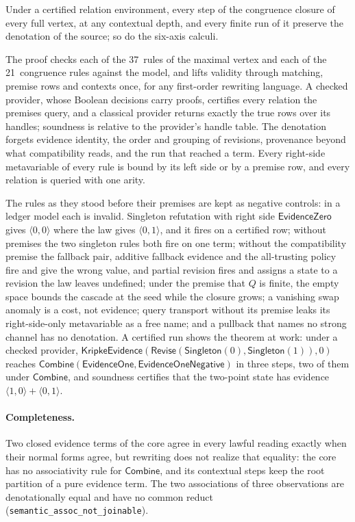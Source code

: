 \documentclass[11pt,openany]{report}
\begin{document}
\begin{theorem}
Under a certified relation environment, every step of the congruence closure
of every full vertex, at any contextual depth, and every finite run of it
preserve the denotation of the source; so do the six-axis calculi.
\end{theorem}

\noindent
The proof checks each of the 37~rules of the maximal vertex and each of the
21~congruence rules against the model, and lifts validity through matching,
premise rows and contexts once, for any first-order rewriting language.  A
checked provider, whose Boolean decisions carry proofs, certifies every
relation the premises query, and a classical provider returns exactly the
true rows over its handles; soundness is relative to the provider's handle
table.  The denotation forgets evidence identity, the order and grouping of
revisions, provenance beyond what compatibility reads, and the run that
reached a term.  Every right-side metavariable of every rule is bound by its
left side or by a premise row, and every relation is queried with one arity.

The rules as they stood before their premises are kept as negative controls:
in a ledger model each is invalid.  Singleton refutation with right side
$\mathsf{EvidenceZero}$ gives $\langle 0, 0\rangle$ where the law gives
$\langle 0, 1\rangle$, and it fires on a certified row; without premises the
two singleton rules both fire on one term; without the compatibility premise
the fallback pair, additive fallback evidence and the all-trusting policy fire
and give the wrong value, and partial revision fires and assigns a state to a
revision the law leaves undefined;
under the premise that $Q$ is finite, the empty space bounds the cascade at
the seed while the closure grows; a vanishing swap anomaly is a cost, not
evidence; query transport without its premise leaks its right-side-only
metavariable as a free name; and a pullback that names no strong channel has
no denotation.  A certified run shows the theorem at work: under a checked
provider, $\mathsf{KripkeEvidence}(\mathsf{Revise}(\mathsf{Singleton}(0),
\mathsf{Singleton}(1)), 0)$ reaches
$\mathsf{Combine}(\mathsf{EvidenceOne}, \mathsf{EvidenceOneNegative})$ in
three steps, two of them under $\mathsf{Combine}$, and soundness certifies
that the two-point state has evidence $\langle 1, 0\rangle + \langle 0,
1\rangle$.

\paragraph{Completeness.}
Two closed evidence terms of the core agree in every lawful reading exactly
when their normal forms agree, but rewriting does not realize that equality:
the core has no associativity rule for $\mathsf{Combine}$, and its contextual
steps keep the root partition of a pure evidence term.  The two associations
of three observations are denotationally equal and have no common reduct
(\texttt{semantic\_assoc\_not\_joinable}).
\end{document}
